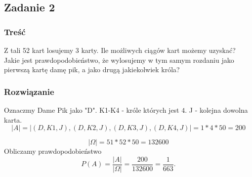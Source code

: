 \subsection{Zadanie 2}

\subsubsection*{Treść}
Z tali 52 kart losujemy 3 karty. Ile możliwych ciągów kart możemy uzyskać? Jakie jest prawdopodobieństwo, że wylosujemy w tym samym rozdaniu jako pierwszą kartę damę pik, a jako drugą jakiekolwiek króla?


\subsubsection*{Rozwiązanie}
Oznaczmy Dame Pik jako "D".
K1-K4 - króle których jest $4$.
J - kolejna dowolna karta.
$$
|A|= |{(D,K1,J), (D,K2,J), (D,K3,J), (D,K4,J)}| = 1 * 4 * 50 = 200
$$

$$
|\Omega| = 51*52*50 = 132600
$$
Obliczamy prawdopodobieństwo
$$
P(A)=\frac{|A|}{|\Omega|}=\frac{200}{132600}=\frac{1}{663}.
$$

